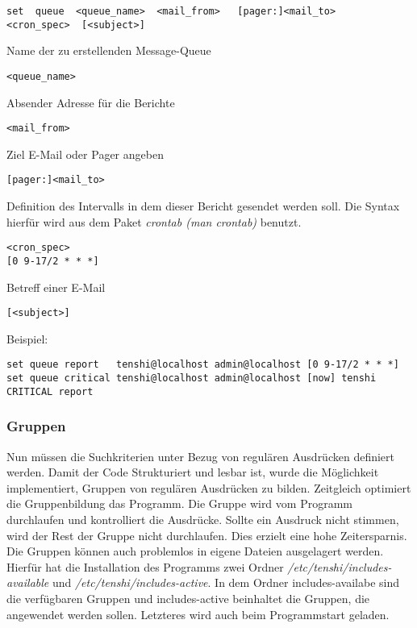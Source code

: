 \begin{lstlisting}
set  queue  <queue_name>  <mail_from>   [pager:]<mail_to>   <cron_spec>  [<subject>]
\end{lstlisting} 		
Name der zu erstellenden Message-Queue 
\begin{lstlisting}
<queue_name>
\end{lstlisting}
Absender Adresse für die Berichte 
\begin{lstlisting}
<mail_from>
\end{lstlisting}	

Ziel E-Mail oder Pager angeben 
\begin{lstlisting}
[pager:]<mail_to>
\end{lstlisting}
	
Definition des Intervalls in dem dieser Bericht gesendet werden soll. Die Syntax hierfür wird aus dem Paket \textit{crontab (man crontab)} benutzt.
\begin{lstlisting}
<cron_spec>
[0 9-17/2 * * *]
\end{lstlisting}
Betreff einer E-Mail
\begin{lstlisting}
[<subject>]
\end{lstlisting}

Beispiel:
\begin{lstlisting}
set queue report   tenshi@localhost admin@localhost [0 9-17/2 * * *]
set queue critical tenshi@localhost admin@localhost [now] tenshi CRITICAL report
\end{lstlisting}

\subsubsection{Gruppen}
Nun müssen die Suchkriterien unter Bezug von regulären Ausdrücken definiert werden. Damit der Code Strukturiert und lesbar ist, wurde die Möglichkeit implementiert, Gruppen von regulären Ausdrücken zu bilden. Zeitgleich optimiert die Gruppenbildung das Programm. Die Gruppe wird vom Programm durchlaufen und kontrolliert die Ausdrücke. Sollte ein Ausdruck nicht stimmen, wird der Rest der Gruppe nicht durchlaufen. Dies erzielt eine hohe Zeitersparnis.
Die Gruppen können auch problemlos in eigene Dateien ausgelagert werden. Hierfür hat die Installation des Programms zwei Ordner \textit{/etc/tenshi/includes-available} und \textit{/etc/tenshi/includes-active}. In dem Ordner includes-availabe sind die verfügbaren Gruppen und includes-active beinhaltet die Gruppen, die angewendet werden sollen. Letzteres wird auch beim Programmstart geladen.

